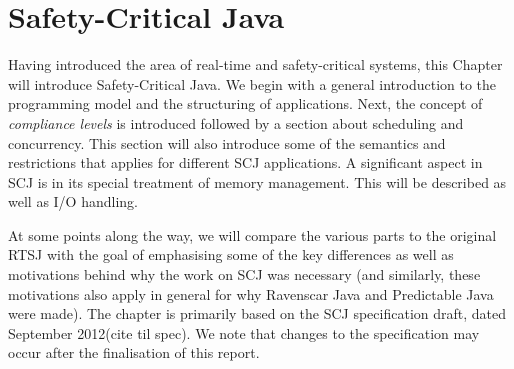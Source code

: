\chapter{Safety-Critical Java}
\label{chapter:scj}
Having introduced the area of real-time and safety-critical systems, this Chapter will introduce Safety-Critical Java. We begin with a general introduction to the programming model and the structuring of applications. Next, the concept of \textit{compliance levels} is introduced followed by a section about scheduling and concurrency. This section will also introduce some of the semantics and restrictions that applies for different SCJ applications. A significant aspect in SCJ is in its special treatment of memory management. This will be described as well as I/O handling.

At some points along the way, we will compare the various parts to the original RTSJ with the goal of emphasising some of the key differences as well as motivations behind why the work on SCJ was necessary (and similarly, these motivations also apply in general for why Ravenscar Java and Predictable Java were made). The chapter is primarily based on the SCJ specification draft, dated September 2012(cite til spec). We note that changes to the specification may occur after the finalisation of this report.